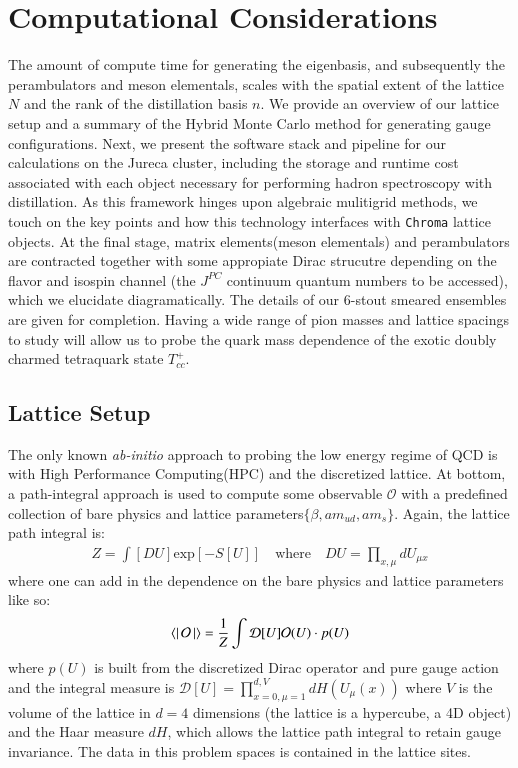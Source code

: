 \chapter{Computational Considerations}\label{sec:comp}
The amount of compute time for generating the eigenbasis, and subsequently the perambulators and meson elementals, scales with the spatial extent of the lattice $N$ and the rank of the distillation basis $n$. We provide an overview of our lattice setup and a summary of the Hybrid Monte Carlo method for generating gauge configurations. Next, we present the software stack and pipeline for our calculations on the Jureca cluster, including the storage and runtime cost associated with each object necessary for performing hadron spectroscopy with distillation. As this framework hinges upon algebraic mulitigrid methods, we touch on the key points and how this technology interfaces with \texttt{Chroma} lattice objects. At the final stage, matrix elements(meson elementals) and perambulators are contracted together with some appropiate Dirac strucutre depending on the flavor and isospin channel (the $J^{PC}$ continuum quantum numbers to be accessed), which we elucidate diagramatically. The details of our 6-stout smeared ensembles are given for completion. Having a wide range of pion masses and lattice spacings to study will allow us to probe the quark mass dependence of the exotic doubly charmed tetraquark state $T_{cc}^+$.   

\section{Lattice Setup}
The only known \textit{ab-initio} approach to probing the low energy regime of QCD is with High Performance Computing(HPC) and the discretized lattice. At bottom, a path-integral approach is used to compute some observable $\mathcal{O}$ with a predefined collection of bare physics and lattice parameters$\{\beta,am_{ud},am_s\}$. Again, the lattice path integral is:
\begin{align}
  Z = \int [DU] \text{exp}\left[-S[U]\right] \quad \text{where} \quad  DU = \prod_{x,\mu}^{} dU_{\mu x}
\end{align} where one can add in the dependence on the bare physics and lattice parameters like so: 
\begin{equation}
  \bra{}\mathcal{O}\ket{} = \frac{1}{Z} \int \mathcal{D}[U] \mathcal{O}(U) \cdot p(U)
\end{equation} where $p(U)$ is built from the discretized Dirac operator and pure gauge action and the integral measure is $\mathcal{D}[U] = \prod_{x=0,\mu=1}^{d,V} dH(U_\mu(x))$ where $V$ is the volume of the lattice in $d=4$ dimensions (the lattice is a hypercube, a 4D object) and the Haar measure $dH$, which allows the lattice path integral to retain gauge invariance. The data in this problem spaces is contained in the lattice sites. 

